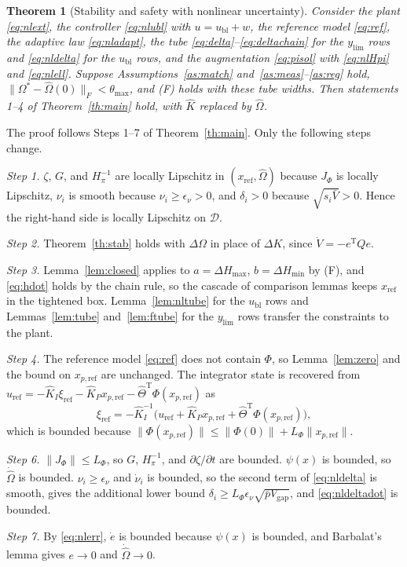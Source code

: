 \documentclass[lettersize,journal]{IEEEtran}
\newtheorem{theorem}{Theorem}
\newcommand{\Kh}{\hat{K}}
\newcommand{\xr}{x_{\mathrm{ref}}}
\newcommand{\xpr}{x_{p,\mathrm{ref}}}
\newcommand{\ub}{u_{\mathrm{bl}}}
\newcommand{\uref}{u_{\mathrm{ref}}}
\newcommand{\ylim}{y_{\mathrm{lim}}}
\newcommand{\Vb}{\bar{V}}
\newcommand{\Vg}{V_{\mathrm{gap}}}
\newcommand{\tmax}{\theta_{\max}}
\newcommand{\T}{\mathrm{T}}
\begin{document}
\begin{theorem}[Stability and safety with nonlinear uncertainty] \label{th:nlmain}
Consider the plant \eqref{eq:nlext}, the controller \eqref{eq:nlubl} with $u=\ub+w$, the reference model \eqref{eq:ref}, the adaptive law \eqref{eq:nladapt}, the tube \eqref{eq:delta}--\eqref{eq:deltachain} for the $\ylim$ rows and \eqref{eq:nldelta} for the $\ub$ rows, and the augmentation \eqref{eq:pisol} with \eqref{eq:nlHpi} and \eqref{eq:nlell}. Suppose Assumptions~\ref{as:match} and~\ref{as:meas}--\ref{as:reg} hold, $\|\Omega^*-\hat\Omega(0)\|_F<\tmax$, and (F) holds with these tube widths. Then statements 1--4 of Theorem~\ref{th:main} hold, with $\Kh$ replaced by $\hat\Omega$.
\end{theorem}
\begin{IEEEproof}
The proof follows Steps 1--7 of Theorem~\ref{th:main}. Only the following steps change.

\emph{Step 1.} $\zeta$, $G$, and $H_\pi^{-1}$ are locally Lipschitz in $(\xr,\hat\Omega)$ because $J_\Phi$ is locally Lipschitz, $\nu_i$ is smooth because $\nu_i\ge\epsilon_\nu>0$, and $\delta_i>0$ because $\sqrt{s_i\Vb}>0$. Hence the right-hand side is locally Lipschitz on $\mathcal{D}$.

\emph{Step 2.} Theorem~\ref{th:stab} holds with $\Delta\Omega$ in place of $\Delta K$, since $\dot V=-e^\T Qe$.

\emph{Step 3.} Lemma~\ref{lem:closed} applies to $a=\Delta H_{\max}$, $b=\Delta H_{\min}$ by (F), and \eqref{eq:hdot} holds by the chain rule, so the cascade of comparison lemmas keeps $\xr$ in the tightened box. Lemma~\ref{lem:nltube} for the $\ub$ rows and Lemmas~\ref{lem:tube} and~\ref{lem:ftube} for the $\ylim$ rows transfer the constraints to the plant.

\emph{Step 4.} The reference model \eqref{eq:ref} does not contain $\Phi$, so Lemma~\ref{lem:zero} and the bound on $\xpr$ are unchanged. The integrator state is recovered from $\uref=-\Kh_I\xi_{\mathrm{ref}}-\Kh_P\xpr-\hat\Theta^\T\Phi(\xpr)$ as
\begin{equation*}
\xi_{\mathrm{ref}}=-\Kh_I^{-1}\big(\uref+\Kh_P\xpr+\hat\Theta^\T\Phi(\xpr)\big),
\end{equation*}
which is bounded because $\|\Phi(\xpr)\|\le\|\Phi(0)\|+L_\Phi\|\xpr\|$.

\emph{Step 6.} $\|J_\Phi\|\le L_\Phi$, so $G$, $H_\pi^{-1}$, and $\partial\zeta/\partial t$ are bounded. $\psi(x)$ is bounded, so $\dot{\hat\Omega}$ is bounded. $\nu_i\ge\epsilon_\nu$ and $\dot\nu_i$ is bounded, so the second term of \eqref{eq:nldelta} is smooth, gives the additional lower bound $\delta_i\ge L_\Phi\epsilon_\nu\sqrt{\bar p\Vg}$, and \eqref{eq:nldeltadot} is bounded.

\emph{Step 7.} By \eqref{eq:nlerr}, $\dot e$ is bounded because $\psi(x)$ is bounded, and Barbalat's lemma gives $e\to0$ and $\dot{\hat\Omega}\to0$.
\end{IEEEproof}
\end{document}
